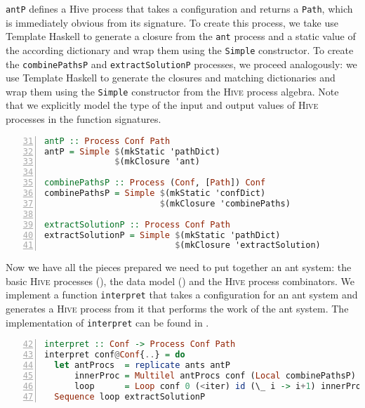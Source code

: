 \texttt{antP} defines a \textsf{Hive} process that takes a configuration and returns a \texttt{Path}, which is immediately obvious from its signature. To create this process, we take use \textsf{Template Haskell} to generate a closure from the \texttt{ant} process and a static value of the according dictionary and wrap them using the \texttt{Simple} constructor. To create the \texttt{combinePathsP} and \texttt{extractSolutionP} processes, we proceed analogously: we use \textsf{Template Haskell} to generate the closures and matching dictionaries and wrap them using the \texttt{Simple} constructor from the \textsc{Hive} process algebra. Note that we explicitly model the type of the input and output values of \textsc{Hive} processes in the function signatures.

\begin{lstlisting}[language=Haskell,frame=tb,numbers=left,firstnumber=31,label=lst:ant_hive,caption={\textsc{Hive} processes, built on top of basic \textsf{Cloud Haskell} processes.}]
antP :: Process Conf Path
antP = Simple $(mkStatic 'pathDict)
              $(mkClosure 'ant)

combinePathsP :: Process (Conf, [Path]) Conf
combinePathsP = Simple $(mkStatic 'confDict)
                       $(mkClosure 'combinePaths)

extractSolutionP :: Process Conf Path
extractSolutionP = Simple $(mkStatic 'pathDict)
                          $(mkClosure 'extractSolution)
\end{lstlisting}

Now we have all the pieces prepared we need to put together an ant system: the basic \textsc{Hive} processes (), the data model () and the \textsc{Hive} process combinators. We implement a function \texttt{interpret} that takes a configuration for an ant system and generates a \textsc{Hive} process from it that performs the work of the ant system. The implementation of \texttt{interpret} can be found in .

\begin{lstlisting}[language=Haskell,frame=tb,numbers=left,firstnumber=42,label=lst:ant_system_complete,caption=Transformation of a configuration for an ant system into a process hierarchy.]
interpret :: Conf -> Process Conf Path
interpret conf@Conf{..} = do
  let antProcs  = replicate ants antP
      innerProc = Multilel antProcs conf (Local combinePathsP)
      loop      = Loop conf 0 (<iter) id (\_ i -> i+1) innerProc
  Sequence loop extractSolutionP
\end{lstlisting}

